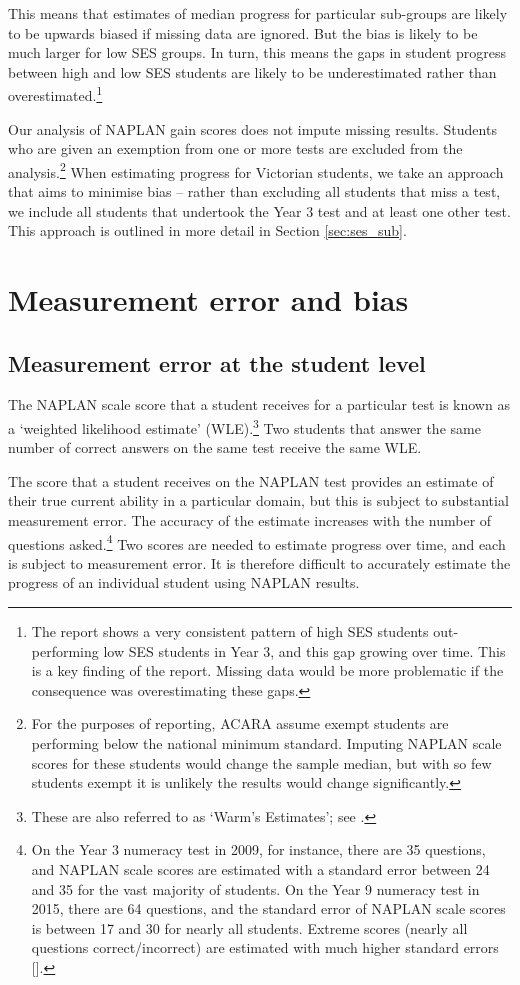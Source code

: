 This means that estimates of median progress for particular sub-groups are likely to be upwards biased if missing data are ignored. But the bias is likely to be much larger for low SES groups. In turn, this means the gaps in student progress between high and low SES students are likely to be underestimated rather than overestimated.\footnote{The report shows a very consistent pattern of high SES students out-performing low SES students in Year 3, and this gap growing over time. This is a key finding of the report. Missing data would be more problematic if the consequence was overestimating these gaps.}

Our analysis of NAPLAN gain scores does not impute missing results. Students who are given an exemption from one or more tests are excluded from the analysis.\footnote{For the purposes of reporting, ACARA assume exempt students are performing below the national minimum standard. Imputing NAPLAN scale scores for these students would change the sample median, but with so few students exempt it is unlikely the results would change significantly.} When estimating progress for Victorian students, we take an approach that aims to minimise bias -- rather than excluding all students that miss a test, we include all students that undertook the Year 3 test and at least one other test. This approach is outlined in more detail in Section \ref{sec:ses_sub}.

\newpage
\section{Measurement error and bias}

\subsection{Measurement error at the student level}

The NAPLAN scale score that a student receives for a particular test is known as a `weighted likelihood estimate' (WLE).\footnote{These are also referred to as `Warm's Estimates'; see \textcite{warm1989}.} Two students that answer the same number of correct answers on the same test receive the same WLE.

The score that a student receives on the NAPLAN test provides an estimate of their true current ability in a particular domain, but this is subject to substantial measurement error. The accuracy of the estimate increases with the number of questions asked.\footnote{On the Year 3 numeracy test in 2009, for instance, there are 35 questions, and NAPLAN scale scores are estimated with a standard error between 24 and 35 for the vast majority of students. On the Year 9 numeracy test in 2015, there are 64 questions, and the standard error of NAPLAN scale scores is between 17 and 30 for nearly all students. Extreme scores (nearly all questions correct/incorrect) are estimated with much higher standard errors [\textcite{acara2015d}].} Two scores are needed to estimate progress over time, and each is subject to measurement error. It is therefore difficult to accurately estimate the progress of an individual student using NAPLAN results.

